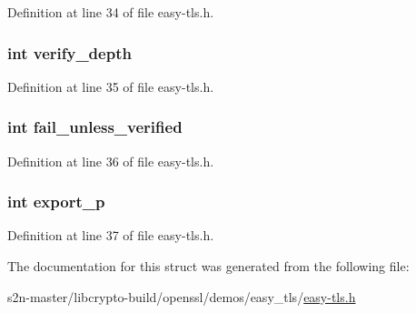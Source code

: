 Definition at line 34 of file easy-\/tls.\+h.

\subsubsection[{\texorpdfstring{verify\+\_\+depth}{verify_depth}}]{\setlength{\rightskip}{0pt plus 5cm}int verify\+\_\+depth}\hypertarget{structtls__create__ctx__args_af960941c08b45889252b28b3dac628c7}{}\label{structtls__create__ctx__args_af960941c08b45889252b28b3dac628c7}


Definition at line 35 of file easy-\/tls.\+h.

\subsubsection[{\texorpdfstring{fail\+\_\+unless\+\_\+verified}{fail_unless_verified}}]{\setlength{\rightskip}{0pt plus 5cm}int fail\+\_\+unless\+\_\+verified}\hypertarget{structtls__create__ctx__args_ac471c7fd0fe54495c620cc11c77c98dc}{}\label{structtls__create__ctx__args_ac471c7fd0fe54495c620cc11c77c98dc}


Definition at line 36 of file easy-\/tls.\+h.

\subsubsection[{\texorpdfstring{export\+\_\+p}{export_p}}]{\setlength{\rightskip}{0pt plus 5cm}int export\+\_\+p}\hypertarget{structtls__create__ctx__args_a77e8199c15cedf9e2414a6905b608aa7}{}\label{structtls__create__ctx__args_a77e8199c15cedf9e2414a6905b608aa7}


Definition at line 37 of file easy-\/tls.\+h.



The documentation for this struct was generated from the following file\+:\begin{DoxyCompactItemize}
\item 
s2n-\/master/libcrypto-\/build/openssl/demos/easy\+\_\+tls/\hyperlink{easy-tls_8h}{easy-\/tls.\+h}\end{DoxyCompactItemize}
